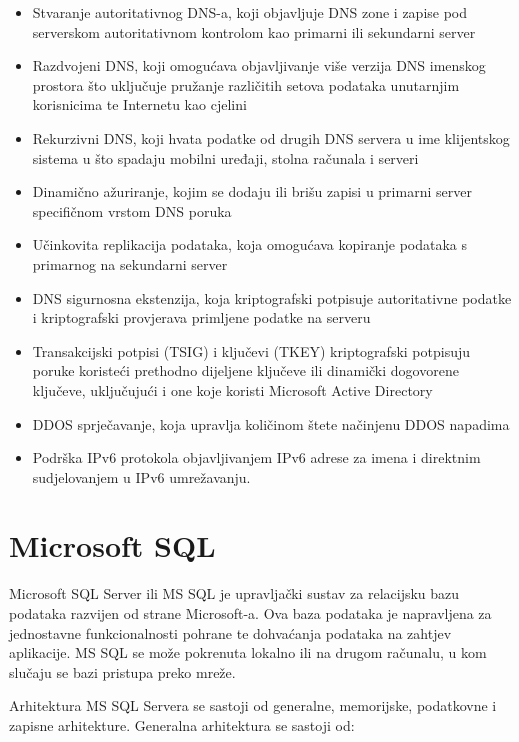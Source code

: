 \documentclass[12pt, oneside, onecolumn]{book}
\begin{document}
{\begin{itemize}
\item Stvaranje autoritativnog DNS-a, koji objavljuje DNS zone i zapise pod serverskom autoritativnom kontrolom kao primarni ili sekundarni server
\item Razdvojeni DNS, koji omogućava objavljivanje više verzija DNS imenskog prostora što uključuje pružanje različitih setova podataka unutarnjim korisnicima te Internetu kao cjelini
\item Rekurzivni DNS, koji hvata podatke od drugih DNS servera u ime klijentskog sistema u što spadaju mobilni uređaji, stolna računala i serveri
\item Dinamično ažuriranje, kojim se dodaju ili brišu zapisi u primarni server specifičnom vrstom DNS poruka
\item Učinkovita replikacija podataka, koja omogućava kopiranje podataka s primarnog na sekundarni server
\item DNS sigurnosna ekstenzija, koja kriptografski potpisuje autoritativne podatke i kriptografski provjerava primljene podatke na serveru
\item Transakcijski potpisi (TSIG) i ključevi (TKEY) kriptografski potpisuju poruke koristeći prethodno dijeljene ključeve ili dinamički dogovorene ključeve, uključujući i one koje koristi Microsoft Active Directory
\item DDOS sprječavanje, koja upravlja količinom štete načinjenu DDOS napadima
\item Podrška IPv6 protokola objavljivanjem IPv6 adrese za imena i direktnim sudjelovanjem u IPv6 umrežavanju.
\end{itemize}

\section{Microsoft SQL}
Microsoft SQL Server ili MS SQL je upravljački sustav za relacijsku bazu podataka razvijen od strane Microsoft-a. Ova baza podataka je napravljena za jednostavne funkcionalnosti pohrane te dohvaćanja podataka na zahtjev aplikacije. MS SQL se može pokrenuta lokalno ili na drugom računalu, u kom slučaju se bazi pristupa preko mreže.

Arhitektura MS SQL Servera se sastoji od generalne, memorijske, podatkovne i zapisne arhitekture. Generalna arhitektura se sastoji od:

}
\end{document}
